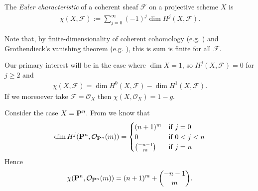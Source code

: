 \documentclass[12pt]{ociamthesis}  %
\begin{document}
\begin{definition}
  The \emph{Euler characteristic} of a coherent sheaf $\mathcal F$
  on a projective scheme $X$ is
  \begin{align*}
    \chi (X,\mathcal F) := \sum_{j=0}^\infty (-1)^j \dim H^j (X,\mathcal F).
  \end{align*}
\end{definition}

Note that, by finite-dimensionality of coherent cohomology
(e.g. \cite[\href{https://stacks.math.columbia.edu/tag/02O6}{Tag 02O6}]{stacks-project}) and Grothendieck's vanishing theorem (e.g.
\cite[III Theorem 2.7]{hartshorne1977}), this is sum is finite for
all $\mathcal F$.

\begin{example}
  Our primary interest will be in the case where
  $\dim X = 1$, so $H^j(X,\mathcal F)=0$ for $j\geq 2$ and
  \begin{align*}
    \chi (X,\mathcal F) = \dim H^0(X,\mathcal F)-\dim H^1(X,\mathcal F).
  \end{align*}
  If we moreoever take $\mathcal F=\mathcal O_X$ then
  $\chi (X,\mathcal O_X) = 1 - g$. 
\end{example}

\begin{example}
  Consider the case $X=\mathbf{P}^{n}_{}$.
  From \missingcitation we know that
  \begin{align*}
    \dim H^j(\mathbf{P}^{n}_{},\mathcal O_{\mathbf{P}^{n}_{}}(m)) =
    \begin{cases}
      (n+1)^m & \text{if }j = 0 \\
      0 &\text{if }0<j<n \\
      \binom{-n-1}{m} &\text{if }j=n
    \end{cases}
  \end{align*}
  Hence 
  \begin{align*}
    \chi(\mathbf{P}^{n}_{},\mathcal O_{\mathbf{P}^{n}_{}}(m))
    = (n+1)^m + \binom{-n-1}{m}.
  \end{align*}
\end{example}

\begin{lemma}
\end{lemma}

\begin{lemma}
\end{lemma}
\end{document}

